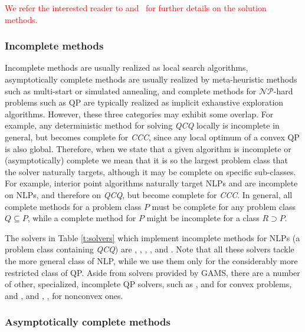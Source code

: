 \textcolor{red}{We refer the interested reader to 
\cite{book:2077007} and 
\cite{Michae-2007}\ for further details on the solution methods.}



\subsubsection{Incomplete methods}

Incomplete methods are usually realized as local search algorithms, asymptotically complete methods are usually realized by meta-heuristic methods such as multi-start or simulated annealing, and complete methods for $\mathcal{NP}$-hard problems such as QP are typically realized as implicit exhaustive exploration algorithms. However, these three categories may exhibit some overlap. For example, any deterministic method for solving \textit{QCQ} locally is incomplete in general, but becomes complete for \textit{CCC}, since any local optimum of a convex QP is also global. Therefore, when we state that a given algorithm is incomplete or (asymptotically) complete we mean that it is so the largest problem class that the solver naturally targets, although it may be complete on specific sub-classes. For example, interior point algorithms naturally target NLPs and are incomplete on NLPs, and therefore on \textit{QCQ}, but become complete for \textit{CCC}. In general, all complete methods for a problem class $P$ must be complete for any problem class $Q \subseteq P$, while a complete method for $P$ might be incomplete for a class $R \supset P$.

The solvers in Table \ref{t:solvers} which implement incomplete methods for NLPs (a problem class containing \textit{QCQ}) are \conopt, \ipopt, \minos, \snopt, and \knitro. Note that all these solvers tackle the more general class of NLP, while we use them only for the considerably more restricted class of QP. Aside from solvers provided by GAMS, there are a number of other, specialized, incomplete QP solvers, such as
\cqp \cite{GoulOrbaRobi13:mpc},
\dqp \cite{GoulRobi16:coap} and
\ooqp \cite{GertWrig03:toms}
for convex problems, and
\bqpd \cite{Flet:2000},
\qpa \cite{GoulToin02i} and
\qpb \cite{ConnGoulOrbaToin:2000},
\qpc \cite{GoulOrbaToin03:toms},
\sqic \cite{Gill2015}
for nonconvex ones.

\subsubsection{Asymptotically complete methods}\label{sss:asymc}

